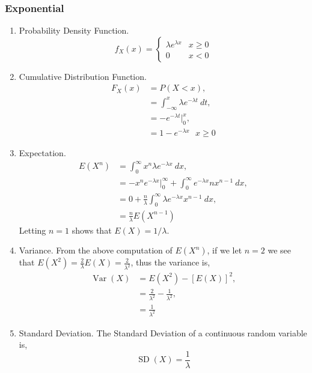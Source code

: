 \documentclass{amsproc}
\DeclareMathOperator{\Var}{\text{Var}}
\DeclareMathOperator{\SD}{\text{SD}}
\begin{document}
			\subsubsection{Exponential}
			\begin{enumerate}
				\item Probability Density Function. 
					\[
						f_{X}(x) = \begin{cases} \lambda e^{\lambda x} & x \geq 0 \\ 0 & x < 0 \end{cases}
					\]

				\item Cumulative Distribution Function.
					\begin{align*}
						F_{X}(x) &= P(X < x), \\
						&= \int_{-\infty}^{x} \lambda e^{-\lambda t} \ dt, \\
						&= -e^{-\lambda t}\Big|_{0}^{x}, \\
						&= 1 - e^{-\lambda x} \ \ \ x \geq 0
					\end{align*}

				\item Expectation.
					\begin{align*}
						E(X^{n}) &= \int_{0}^{\infty} x^{n} \lambda e^{-\lambda x} \ dx, \\
						&= -x^{n}e^{-\lambda x}\big|_{0}^{\infty} + \int_{0}^{\infty} e^{-\lambda x}nx^{n-1} \ dx, \\
						&= 0 + \frac{n}{\lambda}\int_{0}^{\infty}\lambda e^{-\lambda x}x^{n-1} \ dx, \\
						&= \frac{n}{\lambda} E(X^{n-1})
					\end{align*}
				Letting $n = 1$ shows that $E(X) = 1/\lambda$.

				\item Variance. From the above computation of $E(X^{n})$, if we let $n = 2$ we see that $E \left( X^{2} \right) = \frac{2}{\lambda}E(X) = \frac{2}{\lambda^{2}}$, thus the variance is,
					\begin{align*}
						\Var(X) &= E\left( X^{2} \right) - \left[ E\left(X\right) \right]^{2}, \\
						&= \frac{2}{\lambda^{2}} - \frac{1}{\lambda^{2}}, \\
						&= \frac{1}{\lambda^{2}}
					\end{align*}

				\item Standard Deviation. The Standard Deviation of a continuous random variable is,
					\[ \SD(X) = \frac{1}{\lambda} \]
			\end{enumerate}
\end{document}
